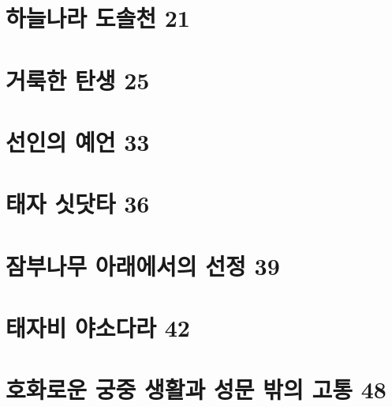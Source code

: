 \documentclass[12pt, a4paper, oneside]{book}
\let\stdsection\section
\renewcommand\section{\newpage\stdsection}
\begin{document}
%
	\section{하늘나라 도솔천 21 }

%
	\section{거룩한 탄생 25 }

%
	\section{선인의 예언 33 }

%
	\section{태자 싯닷타 36 }

%
	\section{잠부나무 아래에서의 선정 39 }

%
	\section{ 태자비 야소다라 42 }

%
	\section{호화로운 궁중 생활과 성문 밖의 고통 48 }
\end{document}
